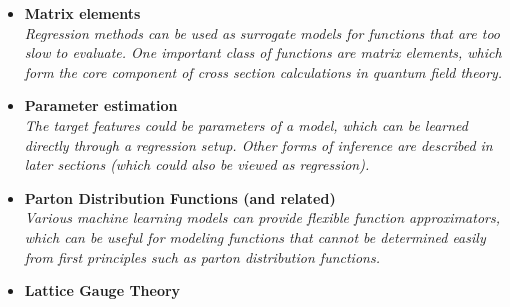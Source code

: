 \documentclass[12pt,letterpaper]{article}
\begin{document}
\begin{itemize}
\begin{itemize}
		\item \textbf{Matrix elements}~\cite{Badger:2020uow,Bishara:2019iwh,1804325,Bury:2020ewi,Sombillo:2021yxe,Sombillo:2021rxv,Aylett-Bullock:2021hmo,Maitre:2021uaa,Danziger:2021eeg,Winterhalder:2021ngy,Karl:2022jda,Alnuqaydan:2022ncd,Dersy:2022bym,Badger:2022hwf,Janssen:2023ahv,Maitre:2023dqz,Kaidisch:2023lwp}
		\\\textit{Regression methods can be used as surrogate models for functions that are too slow to evaluate.  One important class of functions are matrix elements, which form the core component of cross section calculations in quantum field theory.}
		\item \textbf{Parameter estimation}~\cite{Lei:2020ucb,1808105,Lazzarin:2020uvv,Kim:2021pcz,Alda:2021rgt,Craven:2021ems,Castro:2022zpq,Meng:2022lmd,Garg:2022tal,Qiu:2023ihi,AlHammal:2023svo,Shi:2023xfz,Goos:2023opq,Schroder:2023akt,Yang:2023rbg}
		\\\textit{The target features could be parameters of a model, which can be learned directly through a regression setup.  Other forms of inference are described in later sections (which could also be viewed as regression).}
		\item \textbf{Parton Distribution Functions (and related)}~\cite{DelDebbio:2020rgv,Grigsby:2020auv,Rossi:2020sbh,Carrazza:2021hny,Ball:2021leu,Ball:2021xlu,Khalek:2021gon,Iranipour:2022iak,Gao:2022uhg,Gao:2022srd,Candido:2023utz,Wang:2023nab,Kassabov:2023hbm,Wang:2023poi,Fernando:2023obn,Rabemananjara:2023xfq}
		\\\textit{Various machine learning models can provide flexible function approximators, which can be useful for modeling functions that cannot be determined easily from first principles such as parton distribution functions.}
		\item \textbf{Lattice Gauge Theory}~\cite{Kanwar:2003.06413,Favoni:2020reg,Bulusu:2021rqz,Shi:2021qri,Hackett:2021idh,Yoon:2018krb,Zhang:2019qiq,Nguyen:2019gpo,Favoni:2021epq,Chen:2021jey,Bulusu:2021njs,Shi:2022yqw,Luo:2022jzl,Chen:2022ytr,Li:2022ozl,Kang:2022jbg,Albandea:2022fky,Khan:2022vot,Sale:2022snt,Kim:2022rna,Karsch:2022yka,Favoni:2022mcg,Chen:2022asj,Bacchio:2022vje,Bacchio:2022vje,Gao:2022uhg,Aguilar:2022thg,Lawrence:2022dba,Peng:2022wdl,Lehner:2023bba,Albandea:2023wgd,Nicoli:2023qsl,Aronsson:2023rli,Zhou:2023pti,Hudspith:2023loy,R:2023dcr,Bender:2023gwr,NarcisoFerreira:2023kak,Lehner:2023prf,Singha:2023xxq,Riberdy:2023awf,Buzzicotti:2023qdv,Caselle:2023mvh,Detmold:2023kjm,Kashiwa:2023dfx,Ermann:2023unw,Albandea:2023ais,Alvestad:2023jgl,Tomiya:2023jdy}

\end{itemize}
\end{itemize}
\end{document}

